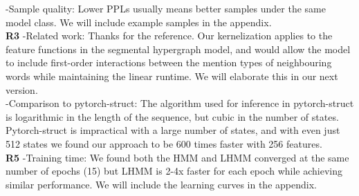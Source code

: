 \documentclass{article}
\begin{document}
-Sample quality: Lower PPLs usually means better samples under the same model class. We will include example samples in the appendix. \\
\textbf{R3} -Related work: Thanks for the reference. Our kernelization applies to the feature functions in the segmental hypergraph model, and would allow the model to include first-order interactions between the mention types of neighbouring words while maintaining the linear runtime. We will elaborate this in our next version.\\
-Comparison to pytorch-struct: The algorithm used for inference in pytorch-struct is logarithmic in the length of the sequence, but cubic in the number of states.
Pytorch-struct is impractical with a large number of states, and with even just 512 states we found our approach to be 600 times faster with 256 features. %
\\
\textbf{R5} -Training time: We found both the HMM and LHMM converged at the same number of epochs (15) but LHMM is 2-4x faster for each epoch while achieving similar performance. We will include the learning curves in the appendix.
\end{document}
